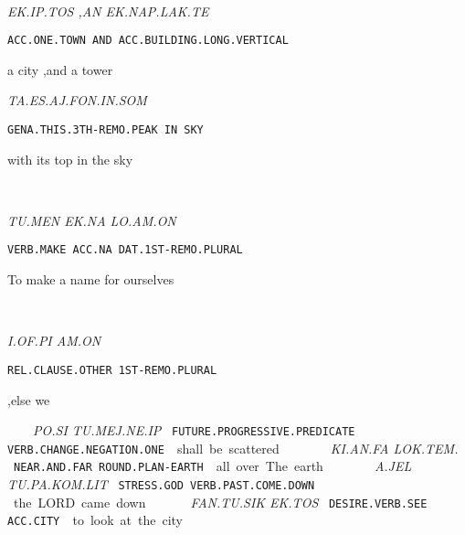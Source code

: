 {\ek\ip\tos\comma~\an~\ek\nap\lak\te

{\it EK.IP.TOS		,AN	EK.NAP.LAK.TE	 }

{\tt ACC.ONE.TOWN		AND	ACC.BUILDING.LONG.VERTICAL }

a city			,and 	a tower	 
\drie

\ta\es\aj\fon\Atlanin\som

{\it TA.ES.AJ.FON.IN.SOM }

{\tt GENA.THIS.3TH-REMO.PEAK	IN	SKY }

with its top 				in           the sky 
\drie

  

\tu\men~	\ek\na~		\lo\am\on 

{\it TU.MEN	EK.NA		LO.AM.ON }

{\tt VERB.MAKE	ACC.NA		DAT.1ST-REMO.PLURAL	 }

To make 	a name 		for ourselves		 

\drie

 

\Atlani\of\Atlanpi ~ \am\on

{\it I.OF.PI			AM.ON }

{\tt REL.CLAUSE.OTHER	1ST-REMO.PLURAL }

,else 			we 

\drie
 

\po\si~\tu\mej\Atlanne\ip

{\it PO.SI			  TU.MEJ.NE.IP		 }

{\tt FUTURE.PROGRESSIVE.PREDICATE    VERB.CHANGE.NEGATION.ONE        }

shall be			    scattered			
\drie 


\ki\an\fa ~ \lok\tem\period

{\it KI.AN.FA		LOK.TEM. }

{\tt NEAR.AND.FAR		ROUND.PLAN-EARTH }

all over			The earth.
\drie 
 
\Atlana\jel ~ \tu\pa\kom\lit 

{\it A.JEL			TU.PA.KOM.LIT			 }

{\tt STRESS.GOD         VERB.PAST.COME.DOWN		}

the LORD 		came down 			

\drie 

\fan\tu\sik ~ \ek\tos

{\it FAN.TU.SIK		EK.TOS }

{\tt DESIRE.VERB.SEE	ACC.CITY }

to look			at the city 

}
